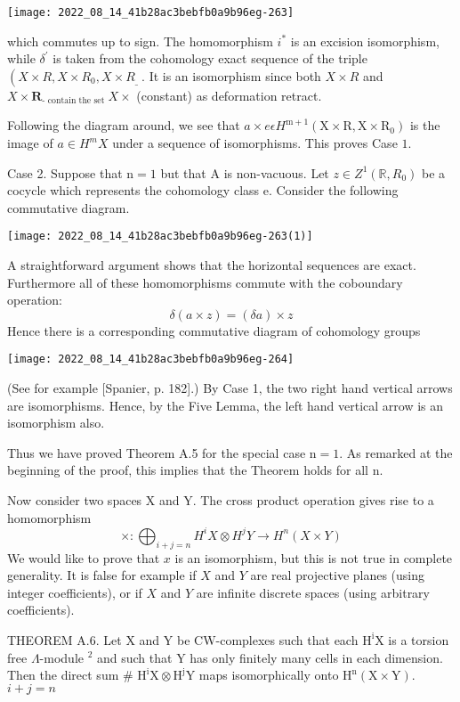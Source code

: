 \documentclass[10pt]{article}
\begin{document}
\texttt{[image: 2022\_08\_14\_41b28ac3bebfb0a9b96eg-263]}

which commutes up to sign. The homomorphism $i^{*}$ is an excision isomorphism, while $\delta^{\prime}$ is taken from the cohomology exact sequence of the triple $\left(X \times R, X \times R_{0}, X \times R_{\text {_ }}\right.$. It is an isomorphism since both $X \times R$ and $X \times \mathbf{R}_{\text {- contain the set }} X \times$ (constant) as deformation retract.

Following the diagram around, we see that $a \times e \epsilon H^{\mathrm{m}+1}\left(\mathrm{X} \times \mathrm{R}, \mathrm{X} \times \mathrm{R}_{0}\right)$ is the image of $a \in H^{m} X$ under a sequence of isomorphisms. This proves Case $1 .$

Case 2. Suppose that $\mathrm{n}=1$ but that $\mathrm{A}$ is non-vacuous. Let $z \in Z^{1}\left(\mathbb{R}, R_{0}\right)$ be a cocycle which represents the cohomology class e. Consider the following commutative diagram.

\texttt{[image: 2022\_08\_14\_41b28ac3bebfb0a9b96eg-263(1)]}

A straightforward argument shows that the horizontal sequences are exact. Furthermore all of these homomorphisms commute with the coboundary operation:
$$
\delta(a \times z)=(\delta a) \times z
$$
Hence there is a corresponding commutative diagram of cohomology groups

\texttt{[image: 2022\_08\_14\_41b28ac3bebfb0a9b96eg-264]}

(See for example [Spanier, p. 182].) By Case 1, the two right hand vertical arrows are isomorphisms. Hence, by the Five Lemma, the left hand vertical arrow is an isomorphism also.

Thus we have proved Theorem A.5 for the special case $\mathrm{n}=1$. As remarked at the beginning of the proof, this implies that the Theorem holds for all n.

Now consider two spaces $\mathrm{X}$ and $\mathrm{Y}$. The cross product operation gives rise to a homomorphism
$$
\times: \bigoplus_{i+j=n} H^{i} X \otimes H^{j} Y \rightarrow H^{n}(X \times Y)
$$
We would like to prove that $x$ is an isomorphism, but this is not true in complete generality. It is false for example if $X$ and $Y$ are real projective planes (using integer coefficients), or if $X$ and $Y$ are infinite discrete spaces (using arbitrary coefficients).

THEOREM A.6. Let $\mathrm{X}$ and $\mathrm{Y}$ be CW-complexes such that each $\mathrm{H}^{\mathrm{i}} \mathrm{X}$ is a torsion free $\Lambda$-module ${ }^{2}$ and such that $\mathrm{Y}$ has only finitely many cells in each dimension. Then the direct sum \# $\mathrm{H}^{\mathrm{i}} \mathrm{X} \otimes \mathrm{H}^{\mathrm{j}} \mathrm{Y}$ maps isomorphically onto $\mathrm{H}^{\mathrm{n}}(\mathrm{X} \times \mathrm{Y})$. $i+j=n$
\end{document}
